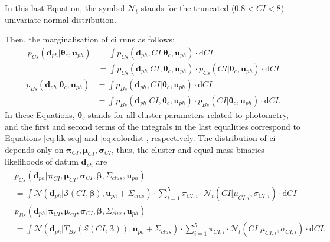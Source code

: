 In this last Equation, the symbol $\mathcal{N}_t$ stands for the truncated ($0.8<CI<8$) univariate normal distribution.

Then, the marginalisation of \gls{ci} runs as follows:
\begin{align}
\label{eq:clmarginalps}
 p_{Cs}(\mathbf{d}_{ph}| \boldsymbol{\theta}_c,\mathbf{u}_{ph})&=\int p_{Cs}(\mathbf{d}_{ph},CI| \boldsymbol{\theta}_c,\mathbf{u}_{ph}) \cdot \mathrm{d}CI \nonumber \\
 &=\int p_{Cs}(\mathbf{d}_{ph}|CI, \boldsymbol{\theta}_c,\mathbf{u}_{ph}) \cdot p_{Cs}(CI| \boldsymbol{\theta}_c,\mathbf{u}_{ph})\cdot \mathrm{d}CI 
\end{align}
\begin{align}
\label{eq:clmarginalpb}
p_{Bs}(\mathbf{d}_{ph}| \boldsymbol{\theta}_c,\mathbf{u}_{ph})&=\int p_{Bs}(\mathbf{d}_{ph},CI| \boldsymbol{\theta}_c,\mathbf{u}_{ph})\cdot \mathrm{d}CI \nonumber \\
 &=\int p_{Bs}(\mathbf{d}_{ph}|CI, \boldsymbol{\theta}_c,\mathbf{u}_{ph})\cdot p_{Bs}(CI| \boldsymbol{\theta}_c,\mathbf{u}_{ph})\cdot \mathrm{d}CI.
\end{align}
In these Equations, $\boldsymbol{\theta}_c$ stands for all cluster parameters related to photometry, and the first and second terms of the integrals in the last equalities correspond to Equations \ref{eq:lik-seq} and \ref{eq:colordist}, respectively. The distribution of \gls{ci} depends only on $\boldsymbol{\pi}_{CI},\boldsymbol{\mu}_{CI},\boldsymbol{\sigma}_{CI}$, thus, the cluster and equal-mass binaries likelihoods of datum $\mathbf{d}_{ph}$ are 
\begin{align}
\label{eq:lik-seq2}
 &p_{Cs}(\mathbf{d}_{ph}|\boldsymbol{\pi}_{CI},\boldsymbol{\mu}_{CI},\boldsymbol{\sigma}_{CI},\boldsymbol{\beta},\Sigma_{clus},\mathbf{u}_{ph}) \nonumber \\
 &=\int{\mathcal{N}}(\mathbf{d}_{ph}|\boldsymbol{\mathcal{S}}(CI, \boldsymbol{\beta}), \mathbf{u}_{ph}+\Sigma_{clus})\cdot \sum_{i=1}^5 \pi_{CI,i}\cdot \mathcal{N}_t(CI| \mu_{CI,i},\sigma_{CI,i}) \cdot \mathrm{d}CI\nonumber \\
&p_{Bs}(\mathbf{d}_{ph}|\boldsymbol{\pi}_{CI},\boldsymbol{\mu}_{CI},\boldsymbol{\sigma}_{CI}, \boldsymbol{\beta},\Sigma_{clus}, \mathbf{u}_{ph})\nonumber \\
&=\int{\mathcal{N}}(\mathbf{d}_{ph}|T_{Bs}( \boldsymbol{\mathcal{S}}(CI, \boldsymbol{\beta})), \mathbf{u}_{ph}+\Sigma_{clus}) \cdot \sum_{i=1}^5 \pi_{CI,i}\cdot \mathcal{N}_t(CI| \mu_{CI,i},\sigma_{CI,i}) \cdot \mathrm{d}CI.
\end{align}

